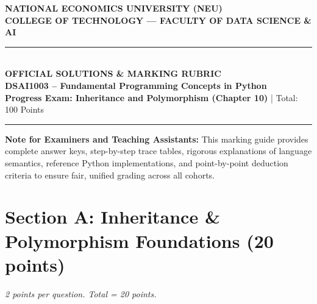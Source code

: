 \documentclass[11pt,a4paper]{article}
\begin{document}
\begin{center}
  {\Large\textbf{NATIONAL ECONOMICS UNIVERSITY (NEU)}}\\[0.05cm]
  {\large\textbf{COLLEGE OF TECHNOLOGY --- FACULTY OF DATA SCIENCE \& AI}}\\[0.12cm]
  \rule{\textwidth}{1pt}\\[0.15cm]
  {\LARGE\bfseries\color{primaryblue}OFFICIAL SOLUTIONS \& MARKING RUBRIC}\\[0.08cm]
  {\large\textbf{DSAI1003 -- Fundamental Programming Concepts in Python}}\\[0.04cm]
  {\normalsize\textbf{Progress Exam: Inheritance and Polymorphism (Chapter 10)} \quad | \quad Total: 100 Points}\\[0.12cm]
  \rule{\textwidth}{0.5pt}
\end{center}

\begin{tcolorbox}[colback=green!6, colframe=correctgreen, arc=1.5mm, top=1mm, bottom=1mm]
\small
\textbf{Note for Examiners and Teaching Assistants:}
This marking guide provides complete answer keys, step-by-step trace tables, rigorous explanations of language semantics, reference Python implementations, and point-by-point deduction criteria to ensure fair, unified grading across all cohorts.
\end{tcolorbox}

\vspace{0.05cm}
\section*{Section A: Inheritance \& Polymorphism Foundations (20 points)}
\textit{2 points per question. Total = 20 points.}
\end{document}
